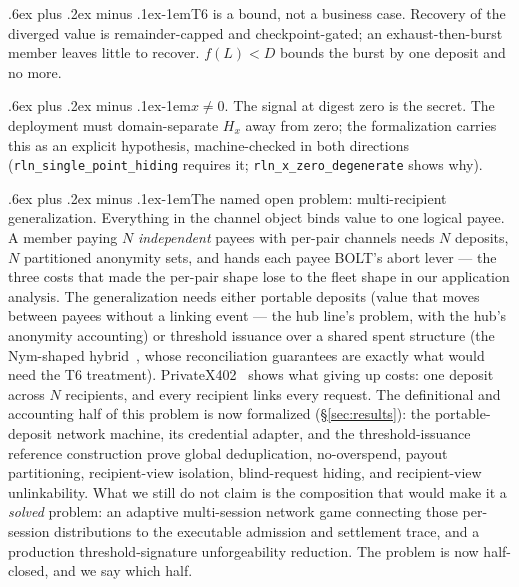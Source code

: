 \documentclass[9pt]{extarticle}
\makeatletter
\renewcommand\paragraph{\@startsection{paragraph}{4}{0pt}%
  {.6ex plus .2ex minus .1ex}{-1em}{\normalfont\normalsize\bfseries}}
\newcommand{\decl}[1]{\nolinkurl{#1}}
\makeatother
\begin{document}
\paragraph{T6 is a bound, not a business case.} Recovery of the diverged
value is remainder-capped and checkpoint-gated; an exhaust-then-burst
member leaves little to recover. $f(L) < D$ bounds the burst by one
deposit and no more.

\paragraph{$x \neq 0$.} The signal at digest zero is the secret. The
deployment must domain-separate $H_x$ away from zero; the formalization
carries this as an explicit hypothesis, machine-checked in both directions
(\decl{rln_single_point_hiding} requires it;
\decl{rln_x_zero_degenerate} shows why).

\paragraph{The named open problem: multi-recipient generalization.}
Everything in the channel object binds value to one logical payee. A
member paying $N$ \emph{independent} payees with per-pair channels needs
$N$ deposits, $N$ partitioned anonymity sets, and hands each payee BOLT's
abort lever --- the three costs that made the per-pair shape lose to the
fleet shape in our application analysis. The generalization needs either
portable deposits (value that moves between payees without a linking
event --- the hub line's problem, with the hub's anonymity accounting) or
threshold issuance over a shared spent structure (the Nym-shaped
hybrid~\cite{nymzknym}, whose reconciliation guarantees are exactly what
would need the T6 treatment). PrivateX402~\cite{privatex402} shows what
giving up costs: one deposit across $N$ recipients, and every recipient
links every request. The definitional and accounting half of this problem
is now formalized (\S\ref{sec:results}): the portable-deposit network
machine, its credential adapter, and the threshold-issuance reference
construction prove global deduplication, no-overspend, payout
partitioning, recipient-view isolation, blind-request hiding, and
recipient-view unlinkability. What we still do not claim is the
composition that would make it a \emph{solved} problem: an adaptive
multi-session network game connecting those per-session distributions to
the executable admission and settlement trace, and a production
threshold-signature unforgeability reduction. The problem is now
half-closed, and we say which half.
\end{document}
